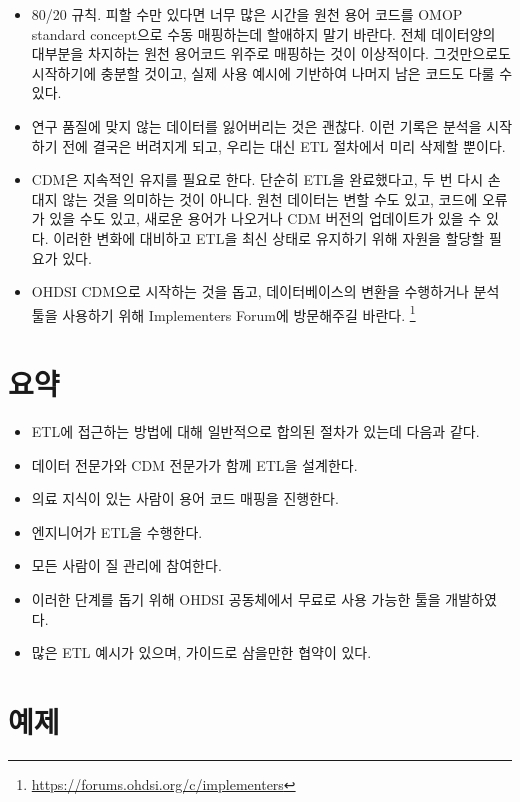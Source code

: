 \documentclass[10.5pt]{book}
\providecommand{\tightlist}{%
  \setlength{\itemsep}{0pt}\setlength{\parskip}{0pt}}
\let\rmarkdownfootnote\footnote%
\def\footnote{\protect\rmarkdownfootnote}
\theoremstyle{definition}
\theoremstyle{definition}
\theoremstyle{definition}
\theoremstyle{remark}
\let\BeginKnitrBlock\begin \let\EndKnitrBlock\end
\begin{document}
\begin{itemize}
\tightlist
\item
  80/20 규칙. 피할 수만 있다면 너무 많은 시간을 원천 용어 코드를 OMOP
  standard concept으로 수동 매핑하는데 할애하지 말기 바란다. 전체
  데이터양의 대부분을 차지하는 원천 용어코드 위주로 매핑하는 것이
  이상적이다. 그것만으로도 시작하기에 충분할 것이고, 실제 사용 예시에
  기반하여 나머지 남은 코드도 다룰 수 있다.
\item
  연구 품질에 맞지 않는 데이터를 잃어버리는 것은 괜찮다. 이런 기록은
  분석을 시작하기 전에 결국은 버려지게 되고, 우리는 대신 ETL 절차에서
  미리 삭제할 뿐이다.
\item
  CDM은 지속적인 유지를 필요로 한다. 단순히 ETL을 완료했다고, 두 번 다시
  손대지 않는 것을 의미하는 것이 아니다. 원천 데이터는 변할 수도 있고,
  코드에 오류가 있을 수도 있고, 새로운 용어가 나오거나 CDM 버전의
  업데이트가 있을 수 있다. 이러한 변화에 대비하고 ETL을 최신 상태로
  유지하기 위해 자원을 할당할 필요가 있다.
\item
  OHDSI CDM으로 시작하는 것을 돕고, 데이터베이스의 변환을 수행하거나
  분석 툴을 사용하기 위해 Implementers Forum에 방문해주길 바란다.
  \footnote{\url{https://forums.ohdsi.org/c/implementers}}
\end{itemize}

\section{요약}\label{-4}

\BeginKnitrBlock{rmdsummary}
\begin{itemize}
\item
  ETL에 접근하는 방법에 대해 일반적으로 합의된 절차가 있는데 다음과
  같다.
\item
  데이터 전문가와 CDM 전문가가 함께 ETL을 설계한다.
\item
  의료 지식이 있는 사람이 용어 코드 매핑을 진행한다.
\item
  엔지니어가 ETL을 수행한다.
\item
  모든 사람이 질 관리에 참여한다.
\item
  이러한 단계를 돕기 위해 OHDSI 공동체에서 무료로 사용 가능한 툴을
  개발하였다.
\item
  많은 ETL 예시가 있으며, 가이드로 삼을만한 협약이 있다.
\end{itemize}
\EndKnitrBlock{rmdsummary}

\section{예제}\label{-2}
\end{document}
